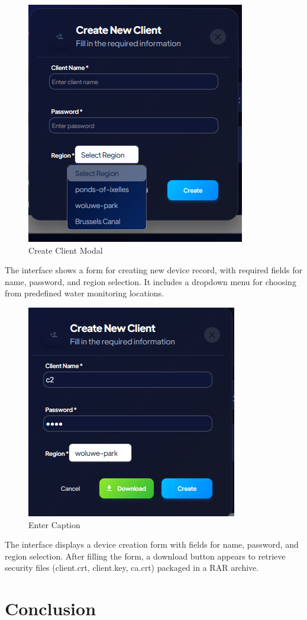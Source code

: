 \begin{figure}[H]
    \centering
    \includegraphics[width=0.5\linewidth]{Figures/create1.png}
    \caption{ Create Client Modal}
    \label{fig:enter-label}
\end{figure}
The interface shows a form for creating new device record, with required fields for name, password, and region selection. It includes a dropdown menu for choosing from predefined water monitoring locations. 
\begin{figure}[H]
    \centering
    \includegraphics[width=0.5\linewidth]{Figures/create2.png}
    \caption{Enter Caption}
    \label{fig:enter-label}
\end{figure}

The interface displays a device creation form with fields for name, password, and region selection. After filling the form, a download button appears to retrieve security files (client.crt, client.key, ca.crt) packaged in a RAR archive.



\newpage

\section*{Conclusion}

